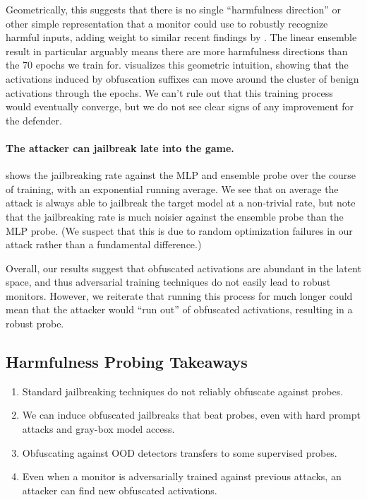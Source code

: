 \documentclass{article}
\begin{document}
Geometrically, this suggests that there is no single
\enquote{harmfulness direction} or other simple representation
that a monitor could use to robustly recognize harmful inputs, adding weight to similar recent findings by \citet{mack2024deep}. 
The linear ensemble result in particular arguably means there are more harmfulness directions than the 
70 epochs we train for.
 visualizes this geometric intuition,
showing that the activations 
induced by obfuscation suffixes can move around 
the cluster of benign activations through the epochs.
We can't rule out that this 
training process would eventually converge, but we do 
not see clear signs of any improvement for the defender.



\paragraph{The attacker can jailbreak late into the game.} 
 shows the 
jailbreaking rate against the MLP and ensemble probe 
over the course of training, with an exponential running 
average. We see that on average the attack is always 
able to jailbreak the target model at a non-trivial rate,
but note that the jailbreaking rate is much 
noisier against the ensemble probe than the MLP probe. (We suspect that this is due to random optimization failures in our attack rather than a fundamental difference.)

Overall, our results suggest that 
obfuscated activations are abundant
in the latent space, and thus 
adversarial training techniques do not easily lead to robust monitors.
However, we reiterate that running this process for much longer
could mean that the 
attacker would \enquote{run out} of obfuscated activations, resulting in a robust probe.



\subsection{Harmfulness Probing Takeaways}

\begin{takeawayBox}
    \begin{enumerate}
        \item Standard jailbreaking techniques do not
        reliably 
        obfuscate against probes.
        \item We can induce obfuscated jailbreaks that beat probes,
        even with hard prompt attacks and gray-box model access.
        \item Obfuscating against OOD detectors transfers to some 
        supervised probes.
        \item Even when a monitor is adversarially trained against previous 
        attacks, an attacker can find new obfuscated activations.
    \end{enumerate}
\end{takeawayBox}
\vspace{1.5mm}
\end{document}

